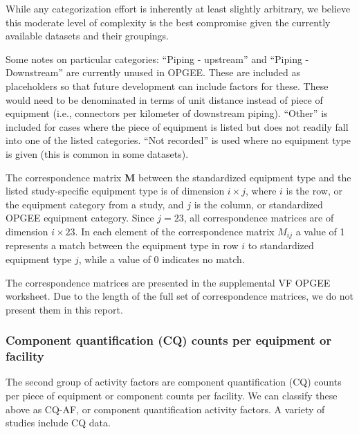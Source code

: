 \documentclass[11pt]{report}
\begin{document}
{{{{While any categorization effort is inherently at least slightly arbitrary, we believe this moderate level of complexity is the best compromise given the currently available datasets and their groupings.  

Some notes on particular categories: ``Piping - upstream'' and ``Piping - Downstream'' are currently unused in OPGEE. These are included as placeholders so that future development can include factors for these. These would need to be denominated in terms of unit distance instead of piece of equipment (i.e., connectors per kilometer of downstream piping).  ``Other'' is included for cases where the piece of equipment is listed but does not readily fall into one of the listed categories.  ``Not recorded'' is used where no equipment type is given (this is common in some datasets).

The correspondence matrix $\textbf{M}$ between the standardized equipment type and the listed study-specific equipment type is of dimension $i \times j$, where $i$ is the row, or the equipment category from a study, and $j$ is the column, or standardized OPGEE equipment category. Since $j = 23$, all correspondence matrices are of dimension $i \times 23$.  In each element of the correspondence matrix $M_{ij}$ a value of 1 represents a match between the equipment type in row $i$ to standardized equipment type $j$, while a value of 0 indicates no match.

The correspondence matrices are presented in the supplemental VF OPGEE worksheet. Due to the length of the full set of correspondence matrices, we do not present them in this report.


\subsubsection{Component quantification (CQ) counts per equipment or facility}

The second group of activity factors are component quantification (CQ) counts per piece of equipment or component counts per facility. We can classify these above as CQ-AF, or component quantification activity factors. A variety of studies include CQ data.  

}}}}
\end{document}
